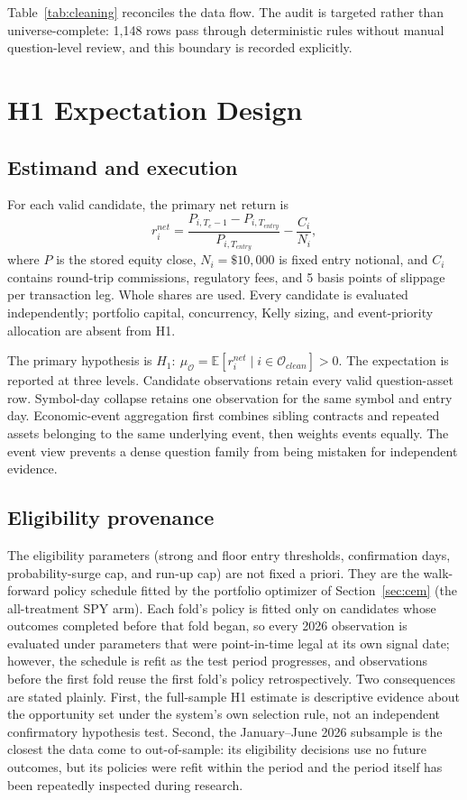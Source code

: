 \documentclass[sigconf,anonymous]{acmart}
\begin{document}
Table~\ref{tab:cleaning} reconciles the data flow. The audit is targeted rather than universe-complete: 1,148 rows pass through deterministic rules without manual question-level review, and this boundary is recorded explicitly.

\section{H1 Expectation Design}

\subsection{Estimand and execution}

For each valid candidate, the primary net return is
\[
r^{net}_i = \frac{P_{i,T_e-1}-P_{i,T_{entry}}}{P_{i,T_{entry}}}
-\frac{C_i}{N_i},
\]
where $P$ is the stored equity close, $N_i=\$10{,}000$ is fixed entry notional, and $C_i$ contains round-trip commissions, regulatory fees, and 5 basis points of slippage per transaction leg. Whole shares are used. Every candidate is evaluated independently; portfolio capital, concurrency, Kelly sizing, and event-priority allocation are absent from H1.

The primary hypothesis is $H_1:\ \mu_{\mathcal O}=\mathbb{E}[r^{net}_i\mid i\in\mathcal O_{clean}]>0$. The expectation is reported at three levels. Candidate observations retain every valid question-asset row. Symbol-day collapse retains one observation for the same symbol and entry day. Economic-event aggregation first combines sibling contracts and repeated assets belonging to the same underlying event, then weights events equally. The event view prevents a dense question family from being mistaken for independent evidence.

\subsection{Eligibility provenance}
\label{sec:provenance}

The eligibility parameters (strong and floor entry thresholds, confirmation days, probability-surge cap, and run-up cap) are not fixed a priori. They are the walk-forward policy schedule fitted by the portfolio optimizer of Section~\ref{sec:cem} (the all-treatment SPY arm). Each fold's policy is fitted only on candidates whose outcomes completed before that fold began, so every 2026 observation is evaluated under parameters that were point-in-time legal at its own signal date; however, the schedule is refit as the test period progresses, and observations before the first fold reuse the first fold's policy retrospectively. Two consequences are stated plainly. First, the full-sample H1 estimate is descriptive evidence about the opportunity set under the system's own selection rule, not an independent confirmatory hypothesis test. Second, the January--June 2026 subsample is the closest the data come to out-of-sample: its eligibility decisions use no future outcomes, but its policies were refit within the period and the period itself has been repeatedly inspected during research.
\end{document}
